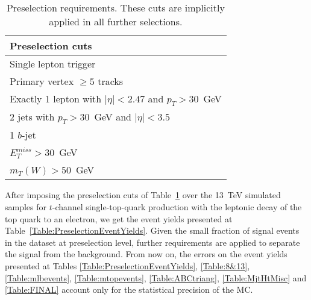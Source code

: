 \begin{table} [htb]
\begin{center}
\begin{tabular}{|l|}
 \hline
 Preselection cuts \\
 \hline
 Single lepton trigger \\
 Primary vertex $\geq 5$ tracks\\
 Exactly 1 lepton with $|\eta| < 2.47$ and $p_T > 30$~GeV \\
 2 jets with $p_T>30$~GeV and $|\eta| < 3.5$ \\
 1 $b$-jet \\
 $E_T^{miss} > 30$~GeV \\
 $m_{T}(W) > 50$~GeV \\
 \hline
 \end{tabular}
\caption{Preselection requirements. These cuts are implicitly applied in all further selections.}
\label{Table:PreselectionCuts}
\end{center}
\end{table}


After imposing the preselection cuts of Table~\ref{Table:PreselectionCuts} over the 13~TeV simulated samples for $t$-channel single-top-quark production with the leptonic decay of the top quark to an electron, we get the event yields presented at Table~\ref{Table:PreselectionEventYields}. Given the small fraction of signal events in the dataset at preselection level, further requirements are applied to separate the signal from the background. From now on, the errors on the event yields presented at Tables \ref{Table:PreselectionEventYields}, \ref{Table:8&13}, \ref{Table:mlbevents}, \ref{Table:mtopevents}, \ref{Table:ABCtriang}, \ref{Table:MjtHtMisc} and \ref{Table:FINAL} account only for the statistical precision of the MC.


